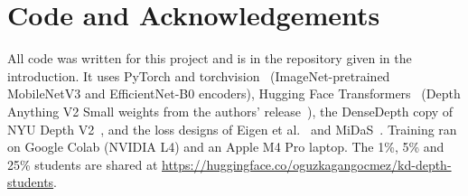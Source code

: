 \documentclass[11pt]{article}
\begin{document}
\section*{Code and Acknowledgements}

All code was written for this project and is in the repository given in the introduction. It uses
PyTorch and torchvision~\cite{paszke2019} (ImageNet-pretrained MobileNetV3 and EfficientNet-B0
encoders), Hugging Face Transformers~\cite{wolf2020} (Depth Anything V2 Small weights from the
authors' release~\cite{yang2024dav2}), the DenseDepth copy of NYU Depth V2~\cite{alhashim2018}, and
the loss designs of Eigen et al.~\cite{eigen2014} and MiDaS~\cite{ranftl2022}. Training ran on
Google Colab (NVIDIA L4) and an Apple M4 Pro laptop. The 1\%, 5\% and 25\% students are shared at
\url{https://huggingface.co/oguzkagangocmez/kd-depth-students}.
\end{document}
